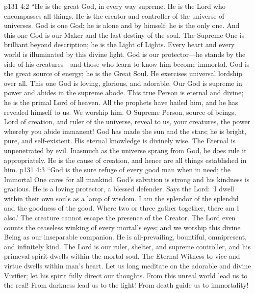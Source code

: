 \pc \vs p131 4:2 “He is the great God, in every way supreme. He is the Lord who encompasses all things. He is the creator and controller of the universe of universes. God is one God; he is alone and by himself; he is the only one. And this one God is our Maker and the last destiny of the soul. The Supreme One is brilliant beyond description; he is the Light of Lights. Every heart and every world is illuminated by this divine light. God is our protector---he stands by the side of his creatures---and those who learn to know him become immortal. God is the great source of energy; he is the Great Soul. He exercises universal lordship over all. This one God is loving, glorious, and adorable. Our God is supreme in power and abides in the supreme abode. This true Person is eternal and divine; he is the primal Lord of heaven. All the prophets have hailed him, and he has revealed himself to us. We worship him. O Supreme Person, source of beings, Lord of creation, and ruler of the universe, reveal to us, your creatures, the power whereby you abide immanent! God has made the sun and the stars; he is bright, pure, and self\hyp{}existent. His eternal knowledge is divinely wise. The Eternal is unpenetrated by evil. Inasmuch as the universe sprang from God, he does rule it appropriately. He is the cause of creation, and hence are all things established in him.
\vs p131 4:3 “God is the sure refuge of every good man when in need; the Immortal One cares for all mankind. God’s salvation is strong and his kindness is gracious. He is a loving protector, a blessed defender. Says the Lord: ‘I dwell within their own souls as a lamp of wisdom. I am the splendor of the splendid and the goodness of the good. Where two or three gather together, there am I also.’ The creature cannot escape the presence of the Creator. The Lord even counts the ceaseless winking of every mortal’s eyes; and we worship this divine Being as our inseparable companion. He is all\hyp{}prevailing, bountiful, omnipresent, and infinitely kind. The Lord is our ruler, shelter, and supreme controller, and his primeval spirit dwells within the mortal soul. The Eternal Witness to vice and virtue dwells within man’s heart. Let us long meditate on the adorable and divine Vivifier; let his spirit fully direct our thoughts. From this unreal world lead us to the real! From darkness lead us to the light! From death guide us to immortality!
